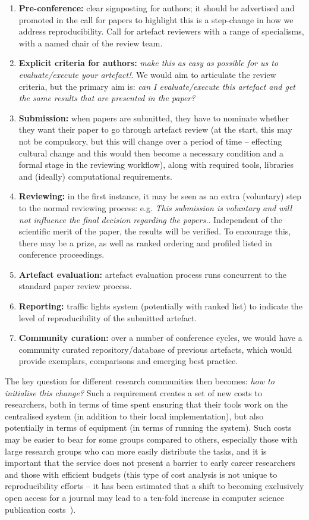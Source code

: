 \documentclass[conference]{IEEEtran}
\begin{document}
\begin{enumerate}
\item {\textbf{Pre-conference:}} clear signposting for authors; it
should be advertised and promoted in the call for papers to
highlight this is a step-change in how we address
reproducibility. Call for artefact reviewers with a range of
specialisms, with a named chair of the review team.
\item {\textbf{Explicit criteria for authors:}} {\emph{make this as
easy as possible for us to evaluate/execute your artefact!}}. We would
aim to articulate the review criteria, but the primary aim is:
{\emph{can I evaluate/execute this artefact and get the same results
that are presented in the paper?}}
\item {\textbf{Submission:}} when papers are submitted, they have to
nominate whether they want their paper to go through artefact review
(at the start, this may not be compulsory, but this will change over a
period of time -- effecting cultural change and this would then become
a necessary condition and a formal stage in the reviewing workflow),
along with required tools, libraries and (ideally) computational
requirements.
\item {\textbf{Reviewing:}} in the first instance, it may be seen as
an extra (voluntary) step to the normal reviewing process:
e.g. {\emph{This submission is voluntary and will not influence the
final decision regarding the papers.}}. Independent of the scientific
merit of the paper, the results will be verified. To encourage this,
there may be a prize, as well as ranked ordering and profiled listed
in conference proceedings.
\item {\textbf{Artefact evaluation:}} artefact evaluation process runs
concurrent to the standard paper review process.
\item {\textbf{Reporting:}} traffic lights system (potentially with
ranked list) to indicate the level of reproducibility of the submitted
artefact.
\item {\textbf{Community curation:}} over a number of conference
  cycles, we would have a community curated repository/database of
  previous artefacts, which would provide exemplars, comparisons and
  emerging best practice.
\end{enumerate}

The key question for different research communities then becomes:
{\emph{how to initialise this change?}} Such a requirement creates a
set of new costs to researchers, both in terms of time spent ensuring
that their tools work on the centralised system (in addition to their
local implementation), but also potentially in terms of equipment (in
terms of running the system). Such costs may be easier to bear for
some groups compared to others, especially those with large research
groups who can more easily distribute the tasks, and it is important
that the service does not present a barrier to early career
researchers and those with efficient budgets (this type of cost
analysis is not unique to reproducibility efforts -- it has been
estimated that a shift to becoming exclusively open access for a
journal may lead to a ten-fold increase in computer science
publication costs~\cite{vardi-cacm-2014}).
\end{document}
